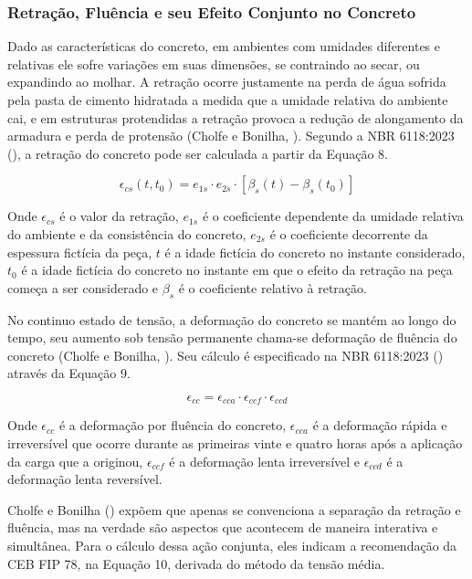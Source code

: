 \subsubsection{Retração, Fluência e seu Efeito Conjunto no Concreto}

\hspace{0.4cm}Dado as características do concreto, em ambientes com umidades diferentes e relativas ele sofre variações em suas dimensões, se contraindo ao secar, ou expandindo ao molhar. A retração ocorre justamente na perda de água sofrida pela pasta de cimento hidratada a medida que a umidade relativa do ambiente cai, e em estruturas protendidas a retração provoca a redução de alongamento da armadura e perda de protensão (Cholfe e Bonilha, \citeyear{CB}). Segundo a NBR 6118:2023 (\citeyear{NOAB}), a retração do concreto pode ser calculada a partir da Equação 8.\bigskip

\begin{equation}
\epsilon_{cs}(t, t_0) = e_{1s} \cdot e_{2s} \cdot [\beta_s(t) - \beta_s(t_0)]
\end{equation}\bigskip

Onde $\epsilon_{cs}$ é o valor da retração, $e_{1s}$ é o coeficiente dependente da umidade relativa do ambiente e da consistência do concreto, $e_{2s}$ é o coeficiente decorrente da espessura fictícia da peça, $t$ é a idade fictícia do concreto no instante considerado, $t_0$ é a idade fictícia do concreto no instante em que o efeito da retração na peça começa a ser considerado e $\beta_s$ é o coeficiente relativo à retração. 

No continuo estado de tensão, a deformação do concreto se mantém ao longo do tempo, seu aumento sob tensão permanente chama-se deformação de fluência do concreto (Cholfe e Bonilha, \citeyear{CB}). Seu cálculo é especificado na NBR 6118:2023 (\citeyear{NOAB}) através da Equação 9.\bigskip

\begin{equation}
\epsilon_{cc} = \epsilon_{cca} \cdot \epsilon_{ccf} \cdot \epsilon_{ccd}
\end{equation}\bigskip

Onde $\epsilon_{cc}$ é a deformação por fluência do concreto, $\epsilon_{cca}$ é a deformação rápida e irreversível que ocorre durante as primeiras vinte e quatro horas após a aplicação da carga que a originou, $\epsilon_{ccf}$ é a deformação lenta irreversível e $\epsilon_{ccd}$ é a deformação lenta reversível. 

Cholfe e Bonilha (\citeyear{CB}) expõem que apenas se convenciona a separação da retração e fluência, mas na verdade são aspectos que acontecem de maneira interativa e simultânea. Para o cálculo dessa ação conjunta, eles indicam a recomendação da CEB FIP 78, na Equação 10, derivada do método da tensão média.\bigskip

